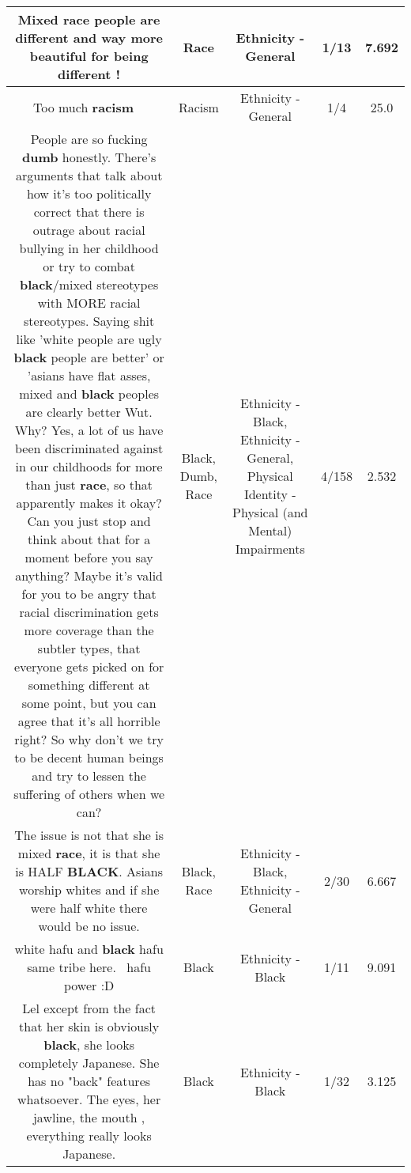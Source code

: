 \documentclass[11pt]{article}
\newlength\mylength
\begin{document}
\begin{center}
\begin{longtable}{|C{.65\mylength}|C{.30\mylength}|C{.12\mylength}|C{.12\mylength}|C{.12\mylength}|}
  \small Mixed \textbf{race} people are different and way more beautiful for being different !\normalsize   & Race & Ethnicity - General & 1/13 & 7.692 \\  \hline
  \small Too much \textbf{racism} 🙅🏻\normalsize   & Racism & Ethnicity - General & 1/4 & 25.0 \\  \hline
  \small People are so fucking \textbf{dumb} honestly. There's arguments that talk about how it's too politically correct that there is outrage about racial bullying in her childhood or try to combat \textbf{black}/mixed stereotypes with MORE racial stereotypes. Saying shit like 'white people are ugly \textbf{black} people are better' or 'asians have flat asses, mixed and \textbf{black} peoples are clearly better Wut. Why? Yes, a lot of us have been discriminated against in our childhoods for more than just \textbf{race}, so that apparently makes it okay? Can you just stop and think about that for a moment before you say anything? Maybe it's valid for you to be angry that racial discrimination gets more coverage than the subtler types, that everyone gets picked on for something different at some point, but you can agree that it's all horrible right? So why don't we try to be decent human beings and try to lessen the suffering of others when we can?\normalsize   & Black, Dumb, Race & Ethnicity - Black, Ethnicity - General, Physical Identity - Physical (and Mental) Impairments & 4/158 & 2.532 \\  \hline
  \small The issue is not that she is mixed \textbf{race}, it is that she is HALF \textbf{BLACK}. Asians worship whites and if she were half white there would be no issue.\normalsize   & Black, Race & Ethnicity - Black, Ethnicity - General & 2/30 & 6.667 \\  \hline
  \small white hafu and \textbf{black} hafu same tribe here.  hafu power :D\normalsize   & Black & Ethnicity - Black & 1/11 & 9.091 \\  \hline
  \small Lel except from the fact that her skin is obviously \textbf{black}, she looks completely Japanese. She has no "back" features whatsoever. The eyes, her jawline, the mouth , everything really looks Japanese.\normalsize   & Black & Ethnicity - Black & 1/32 & 3.125 \\  \hline

\end{longtable}
\end{center}
\end{document}
